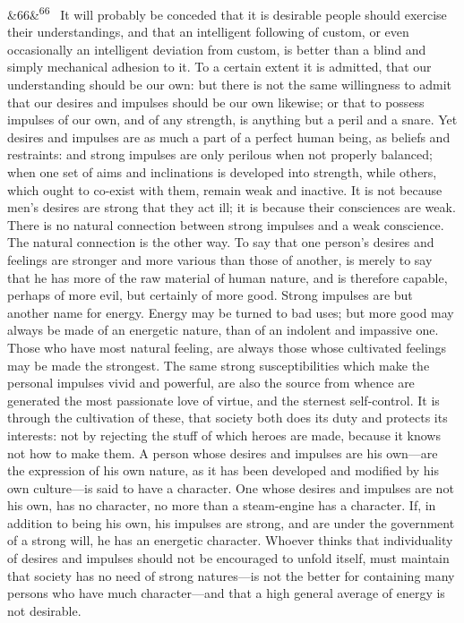 \documentclass[12pt]{article}
\newcommand{\para}[1][]{\par\noindent\ifx&#1&\else\textsuperscript{\footnotesize #1}~\fi}
\begin{document}
\para[66] It will probably be conceded that it is desirable people should exercise their understandings, and that an intelligent following of custom, or even occasionally an intelligent deviation from custom, is better than a blind and simply mechanical adhesion to it. To a certain extent it is admitted, that our understanding should be our own: but there is not the same willingness to admit that our desires and impulses should be our own likewise; or that to possess impulses of our own, and of any strength, is anything but a peril and a snare. Yet desires and impulses are as much a part of a perfect human being, as beliefs and restraints: and strong impulses are only perilous when not properly balanced; when one set of aims and inclinations is developed into strength, while others, which ought to co-exist with them, remain weak and inactive. It is not because men's desires are strong that they act ill; it is because their consciences are weak. There is no natural connection between strong impulses and a weak conscience. The natural connection is the other way. To say that one person's desires and feelings are stronger and more various than those of another, is merely to say that he has more of the raw material of human nature, and is therefore capable, perhaps of more evil, but certainly of more good. Strong impulses are but another name for energy. Energy may be turned to bad uses; but more good may always be made of an energetic nature, than of an indolent and impassive one. Those who have most natural feeling, are always those whose cultivated feelings may be made the strongest. The same strong susceptibilities which make the personal impulses vivid and powerful, are also the source from whence are generated the most passionate love of virtue, and the sternest self-control. It is through the cultivation of these, that society both does its duty and protects its interests: not by rejecting the stuff of which heroes are made, because it knows not how to make them. A person whose desires and impulses are his own---are the expression of his own nature, as it has been developed and modified by his own culture---is said to have a character. One whose desires and impulses are not his own, has no character, no more than a steam-engine has a character. If, in addition to being his own, his impulses are strong, and are under the government of a strong will, he has an energetic character. Whoever thinks that individuality of desires and impulses should not be encouraged to unfold itself, must maintain that society has no need of strong natures---is not the better for containing many persons who have much character---and that a high general average of energy is not desirable.
\end{document}
